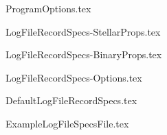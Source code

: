 \clearpage
\appendix

\clearpage
{ProgramOptions.tex}


\clearpage
{LogFileRecordSpecs-StellarProps.tex}


\clearpage
{LogFileRecordSpecs-BinaryProps.tex}


\clearpage
{LogFileRecordSpecs-Options.tex}


\clearpage
{DefaultLogFileRecordSpecs.tex}


\clearpage
{ExampleLogFileSpecsFile.tex}
    
